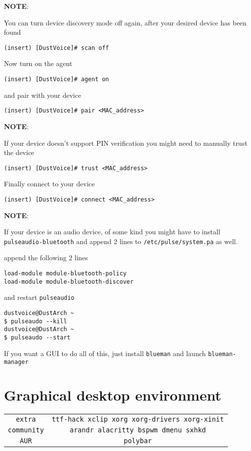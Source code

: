 \documentclass[9pt]{report}
\newcommand{\admonition}[2]{\textbf{#1}: {#2}}
\begin{document}
\admonition{NOTE}{You can turn device discovery mode off again, after your desired device has been found


}
\begin{verbatim}
(insert) [DustVoice]# scan off
\end{verbatim}
Now turn on the agent


\begin{verbatim}
(insert) [DustVoice]# agent on
\end{verbatim}

and pair with your device


\begin{verbatim}
(insert) [DustVoice]# pair <MAC_address>
\end{verbatim}

\admonition{NOTE}{If your device doesn’t support PIN verification you might need to manually trust the device


}
\begin{verbatim}
(insert) [DustVoice]# trust <MAC_address>
\end{verbatim}
Finally connect to your device


\begin{verbatim}
(insert) [DustVoice]# connect <MAC_address>
\end{verbatim}

\admonition{NOTE}{If your device is an audio device, of some kind you might have to install \texttt{pulseaudio-bluetooth} and append 2 lines to \texttt{/etc/pulse/system.pa} as well.


append the following 2 lines


}
\begin{verbatim}
load-module module-bluetooth-policy
load-module module-bluetooth-discover
\end{verbatim}

and restart \texttt{pulseaudio}

\begin{verbatim}
dustvoice@DustArch ~
$ pulseaudo --kill
dustvoice@DustArch ~
$ pulseaudo --start
\end{verbatim}
If you want a GUI to do all of this, just install \texttt{blueman} and launch \texttt{blueman-manager}



\vfill\eject

\hypertarget{x-graphical-desktop-environment}{\section{Graphical desktop environment}}
\begin{center}
\begin{tabular}{|c|c|}
\hline
\texttt{extra} & \texttt{ttf-hack xclip xorg xorg-drivers xorg-xinit} \\ 
\texttt{community} & \texttt{arandr alacritty bspwm dmenu sxhkd} \\ 
\texttt{AUR} & \texttt{polybar} \\ 
\hline
\end{tabular}
\end{center}
\end{document}
